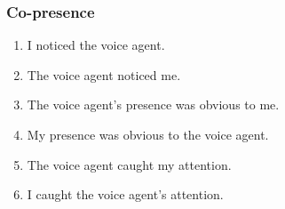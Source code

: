 \subsubsection*{Co-presence}
\begin{enumerate}
\item[Q1.] \begin{minipage}[t]{\linewidth}
I noticed the voice agent.
\end{minipage}
\item[Q2.] \begin{minipage}[t]{\linewidth}
The voice agent noticed me.
\end{minipage}
\item[Q3.] \begin{minipage}[t]{\linewidth}
The voice agent's presence was obvious to me.
\end{minipage}
\item[Q4.] \begin{minipage}[t]{\linewidth}
My presence was obvious to the voice agent.
\end{minipage}
\item[Q5.] \begin{minipage}[t]{\linewidth}
The voice agent caught my attention.
\end{minipage}
\item[Q6.] \begin{minipage}[t]{\linewidth}
I caught the voice agent's attention.
\end{minipage}
\end{enumerate}
